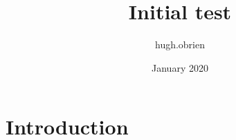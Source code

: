\documentclass{article}
\title{Initial test}
\author{hugh.obrien }
\date{January 2020}
\begin{document}
\maketitle

\section{Introduction}
\end{document}
